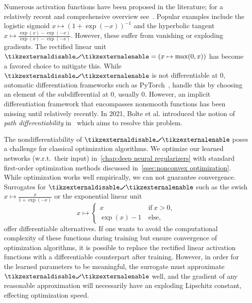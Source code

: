 Numerous activation functions have been proposed in the literature;
for a relatively recent and comprehensive overview see~\cite{dubey_activation_2022}.
Popular examples include the logistic sigmoid \( x \mapsto (\num{1} + \exp(-x))^{\num{-1}} \) and the hyperbolic tangent \( x \mapsto \frac{\exp(x) - \exp(-x)}{\exp(x) - \exp(-x)} \).
However, these suffer from vanishing or exploding gradients.
The rectified linear unit \( \relu = (x \mapsto \max(\num{0}, x)) \) has become a favored choice to mitigate this.
While \( \relu \) is not differentiable at \( \num{0} \), automatic differentiation frameworks such as PyTorch~\cite{paszke_pytorch_2019}, handle this by choosing an element of the subdifferential at \( \num{0} \), usually \( \num{0} \).
However, an implicit differentiation framework that encompasses nonsmooth functions has been missing until relatively recently.
In 2021, Bolte et al. introduced the notion of \emph{path differentiability} in~\cite{bolte_nonsmooth_implicit_2021} which aims to resolve this problem.

The nondifferentiability of \( \relu \) poses a challenge for classical optimization algorithms.
We optimize our learned networks (w.r.t.\ their input) in~\cref{chap:deep neural regularizers} with standard first-order optimization methods discussed in~\cref{ssec:nonconvex optimization}.
While optimization works well empirically, we can not guarantee convergence.
Surrogates for \( \relu \) such as the swish \( x \mapsto \frac{x}{\num{1} + \exp(-x)} \) or the exponential linear unit
\[
	x \mapsto \begin{cases}
		x &\ \text{if}\ x > \num{0}, \\
		\exp(x) - \num{1} &\ \text{else},
	\end{cases}
\]
offer differentiable alternatives.
If one wants to avoid the computational complexity of these functions during training but ensure convergence of optimization algorithms, it is possible to replace the rectified linear activation functions with a differentiable counterpart after training.
However, in order for the learned parameters to be meaningful, the surrogate must approximate \( \relu \) well, and the gradient of any reasonable approximation will necessarily have an exploding Lipschitz constant, effecting optimization speed.

